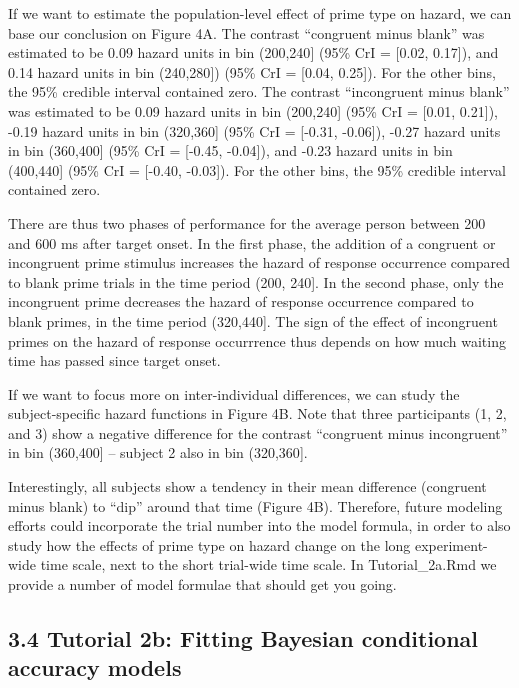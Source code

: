 \documentclass[
  man, donotrepeattitle,floatsintext]{apa6}
\begin{document}
If we want to estimate the population-level effect of prime type on hazard, we can base our conclusion on Figure 4A. The contrast ``congruent minus blank'' was estimated to be 0.09 hazard units in bin (200,240{]} (95\% CrI = {[}0.02, 0.17{]}), and 0.14 hazard units in bin (240,280{]}) (95\% CrI = {[}0.04, 0.25{]}). For the other bins, the 95\% credible interval contained zero.
The contrast ``incongruent minus blank'' was estimated to be 0.09 hazard units in bin (200,240{]} (95\% CrI = {[}0.01, 0.21{]}), -0.19 hazard units in bin (320,360{]} (95\% CrI = {[}-0.31, -0.06{]}), -0.27 hazard units in bin (360,400{]} (95\% CrI = {[}-0.45, -0.04{]}), and -0.23 hazard units in bin (400,440{]} (95\% CrI = {[}-0.40, -0.03{]}). For the other bins, the 95\% credible interval contained zero.

There are thus two phases of performance for the average person between 200 and 600 ms after target onset. In the first phase, the addition of a congruent or incongruent prime stimulus increases the hazard of response occurrence compared to blank prime trials in the time period (200, 240{]}. In the second phase, only the incongruent prime decreases the hazard of response occurrence compared to blank primes, in the time period (320,440{]}. The sign of the effect of incongruent primes on the hazard of response occurrrence thus depends on how much waiting time has passed since target onset.

If we want to focus more on inter-individual differences, we can study the subject-specific hazard functions in Figure 4B. Note that three participants (1, 2, and 3) show a negative difference for the contrast ``congruent minus incongruent'' in bin (360,400{]} -- subject 2 also in bin (320,360{]}.

Interestingly, all subjects show a tendency in their mean difference (congruent minus blank) to ``dip'' around that time (Figure 4B). Therefore, future modeling efforts could incorporate the trial number into the model formula, in order to also study how the effects of prime type on hazard change on the long experiment-wide time scale, next to the short trial-wide time scale. In Tutorial\_2a.Rmd we provide a number of model formulae that should get you going.

\subsection{3.4 Tutorial 2b: Fitting Bayesian conditional accuracy models}\label{tutorial-2b-fitting-bayesian-conditional-accuracy-models}
\end{document}
